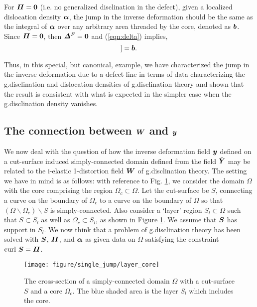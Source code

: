 \documentclass[11pt,letterpaper]{article}
\begin{document}
For $\bfPi = \bf0$ (i.e. no generalized disclination in the defect), given a localized dislocation density $\bfalpha$, the jump in the inverse deformation should be the same as the integral of $\bfalpha$ over any arbitrary area threaded by the core, denoted as $\bfb$.
Since $\bfPi = \bf0$, then $\bfDelta^F=\bf0$ and (\ref{eqn:delta}) implies,
\begin{equation*}
[\![\bfy]\!] = \bfb.
\end{equation*}

Thus, in this special, but canonical, example, we have characterized the jump in the inverse deformation due to a defect line in terms of data characterizing the g.disclination and dislocation densities of g.disclination theory and shown that the result is consistent with what is expected in the simpler case when the g.disclination density vanishes.
\subsection{The connection between $\bfW$ and $\bfy$}
We now deal with the question of how the inverse deformation field $\bfy$ defined on a cut-surface induced simply-connected domain defined from the field $\tilde{\bfY}$ may be related to the i-elastic 1-distortion field $\bfW$ of g.disclination theory. The setting we have in mind is as follows: with reference to Fig. \ref{fig:layer_core}, we consider the domain $\Omega$ with the core comprising the region $\Omega_c \subset \Omega$. Let the cut-surface be $S$, connecting a curve on the boundary of $\Omega_c$ to a curve on the boundary of $\Omega$ so that $(\Omega \backslash \Omega_c)\backslash S$ is simply-connected. Also consider a `layer' region $S_l \subset \Omega$ such that $S \subset S_l$ as well as $\Omega_c \subset S_l$, as shown in Figure \ref{fig:layer_core}. We assume that $\bfS$ has support in $S_l$. We now think that a problem of g.disclination theory has been solved with $\bfS$, $\bfPi$, and $\bfalpha$ as given data on $\Omega$ satisfying the constraint $\curl\, \bfS = \bfPi$.

\begin{figure}
\centering
\texttt{[image: figure/single\_jump/layer\_core]}
\caption{The cross-section of a simply-connected domain $\Omega$ with a cut-surface $S$ and a core $\Omega_c$. The blue shaded area is the layer $S_l$ which includes the core.}
\label{fig:layer_core}
\end{figure}
\end{document}
